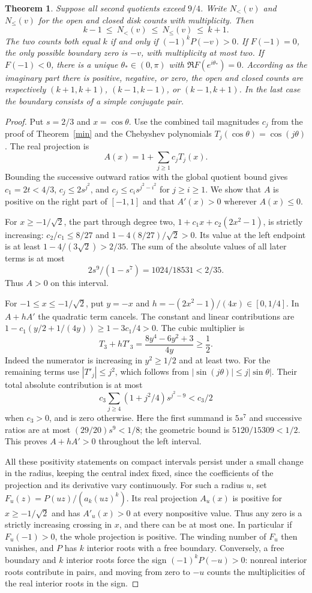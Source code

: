 \documentclass[11pt]{article}
\newtheorem{theorem}{Theorem}
\begin{document}
\begin{theorem}\label{one}
Suppose all second quotients exceed $9/4$. Write $N_{<}(v)$ and $N_{\le}(v)$ for the open and closed disk counts with multiplicity. Then
\[
 k-1\ \le\ N_{<}(v)\ \le\ N_{\le}(v)\ \le\ k+1 .
\]
The two counts both equal $k$ if and only if $(-1)^kP(-v)>0$. If $F(-1)=0$, the only possible boundary zero is $-v$, with multiplicity at most two. If $F(-1)<0$, there is a unique $\theta_*\in(0,\pi)$ with $\Re F(e^{i\theta_*})=0$. According as the imaginary part there is positive, negative, or zero, the open and closed counts are respectively $(k+1,k+1)$, $(k-1,k-1)$, or $(k-1,k+1)$. In the last case the boundary consists of a simple conjugate pair.
\end{theorem}
\begin{proof}
Put $s=2/3$ and $x=\cos\theta$. Use the combined tail magnitudes $c_j$ from the proof of Theorem~\ref{min} and the Chebyshev polynomials $T_j(\cos\theta)=\cos(j\theta)$. The real projection is
\[
 A(x)=1+\sum_{j\ge1}c_jT_j(x).
\]
Bounding the successive outward ratios with the global quotient bound gives $c_1=2t<4/3$, $c_j\le2s^{j^2}$, and $c_j\le c_i s^{j^2-i^2}$ for $j\ge i\ge1$. We show that $A$ is positive on the right part of $[-1,1]$ and that $A'(x)>0$ wherever $A(x)\le0$.

For $x\ge-1/\sqrt2$, the part through degree two, $1+c_1x+c_2(2x^2-1)$, is strictly increasing: $c_2/c_1\le8/27$ and $1-4(8/27)/\sqrt2>0$. Its value at the left endpoint is at least $1-4/(3\sqrt2)>2/35$. The sum of the absolute values of all later terms is at most
\[
 2s^9/(1-s^7)=1024/18531<2/35.
\]
Thus $A>0$ on this interval.

For $-1\le x\le-1/\sqrt2$, put $y=-x$ and $h=-(2x^2-1)/(4x)\in[0,1/4]$. In $A+hA'$ the quadratic term cancels. The constant and linear contributions are $1-c_1(y/2+1/(4y))\ge1-3c_1/4>0$. The cubic multiplier is
\[
 T_3+hT'_3=\frac{8y^4-6y^2+3}{4y}\ge\frac12 .
\]
Indeed the numerator is increasing in $y^2\ge1/2$ and at least two. For the remaining terms use $|T'_j|\le j^2$, which follows from $|\sin(j\theta)|\le j|\sin\theta|$. Their total absolute contribution is at most
\[
 c_3\sum_{j\ge4}(1+j^2/4)s^{j^2-9}<c_3/2
\]
when $c_3>0$, and is zero otherwise. Here the first summand is $5s^7$ and successive ratios are at most $(29/20)s^9<1/8$; the geometric bound is $5120/15309<1/2$. This proves $A+hA'>0$ throughout the left interval.

All these positivity statements on compact intervals persist under a small change in the radius, keeping the central index fixed, since the coefficients of the projection and its derivative vary continuously. For such a radius $u$, set $F_u(z)=P(uz)/(a_k(uz)^k)$. Its real projection $A_u(x)$ is positive for $x\ge-1/\sqrt2$ and has $A'_u(x)>0$ at every nonpositive value. Thus any zero is a strictly increasing crossing in $x$, and there can be at most one. In particular if $F_u(-1)>0$, the whole projection is positive. The winding number of $F_u$ then vanishes, and $P$ has $k$ interior roots with a free boundary. Conversely, a free boundary and $k$ interior roots force the sign $(-1)^kP(-u)>0$: nonreal interior roots contribute in pairs, and moving from zero to $-u$ counts the multiplicities of the real interior roots in the sign.


\end{proof}
\end{document}
